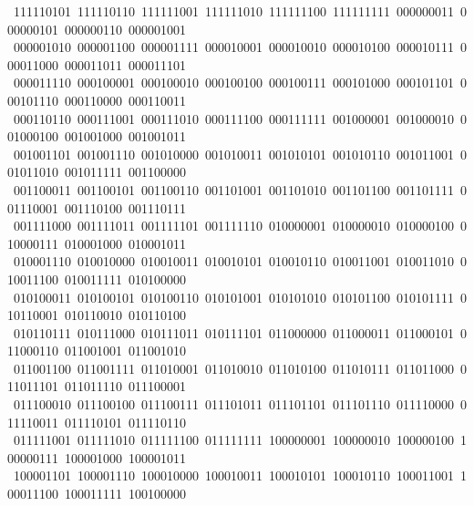 \begin{flushleft}
\ 111110101\ 111110110\ 111111001\ 111111010\ 111111100\ 111111111\ 000000011\ 000000101\ 000000110\ 000001001\\
\ 000001010\ 000001100\ 000001111\ 000010001\ 000010010\ 000010100\ 000010111\ 000011000\ 000011011\ 000011101\\
\ 000011110\ 000100001\ 000100010\ 000100100\ 000100111\ 000101000\ 000101101\ 000101110\ 000110000\ 000110011\\
\ 000110110\ 000111001\ 000111010\ 000111100\ 000111111\ 001000001\ 001000010\ 001000100\ 001001000\ 001001011\\
\ 001001101\ 001001110\ 001010000\ 001010011\ 001010101\ 001010110\ 001011001\ 001011010\ 001011111\ 001100000\\
\ 001100011\ 001100101\ 001100110\ 001101001\ 001101010\ 001101100\ 001101111\ 001110001\ 001110100\ 001110111\\
\ 001111000\ 001111011\ 001111101\ 001111110\ 010000001\ 010000010\ 010000100\ 010000111\ 010001000\ 010001011\\
\ 010001110\ 010010000\ 010010011\ 010010101\ 010010110\ 010011001\ 010011010\ 010011100\ 010011111\ 010100000\\
\ 010100011\ 010100101\ 010100110\ 010101001\ 010101010\ 010101100\ 010101111\ 010110001\ 010110010\ 010110100\\
\ 010110111\ 010111000\ 010111011\ 010111101\ 011000000\ 011000011\ 011000101\ 011000110\ 011001001\ 011001010\\
\ 011001100\ 011001111\ 011010001\ 011010010\ 011010100\ 011010111\ 011011000\ 011011101\ 011011110\ 011100001\\
\ 011100010\ 011100100\ 011100111\ 011101011\ 011101101\ 011101110\ 011110000\ 011110011\ 011110101\ 011110110\\
\ 011111001\ 011111010\ 011111100\ 011111111\ 100000001\ 100000010\ 100000100\ 100000111\ 100001000\ 100001011\\
\ 100001101\ 100001110\ 100010000\ 100010011\ 100010101\ 100010110\ 100011001\ 100011100\ 100011111\ 100100000\\

\end{flushleft}
